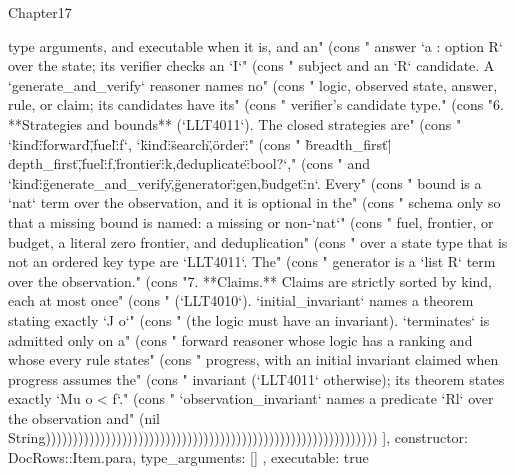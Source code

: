 \begin{lexlean}{Chapter17}
\begin{semanticmodule}
{{type arguments, and executable when it is, and an" (cons "   answer `a : option R` over the state; its verifier checks an `I`" (cons "   subject and an `R` candidate. A `generate_and_verify` reasoner names no" (cons "   logic, observed state, answer, rule, or claim; its candidates have its" (cons "   verifier's candidate type." (cons "6. **Strategies and bounds** (`LLT4011`). The closed strategies are" (cons "   `{\"kind\":\"forward\",\"fuel\":f}`, `{\"kind\":\"search\",\"order\":" (cons "   \"breadth_first\"|\"depth_first\",\"fuel\":f,\"frontier\":k,\"deduplicate\":bool?}`," (cons "   and `{\"kind\":\"generate_and_verify\",\"generator\":gen,\"budget\":n}`. Every" (cons "   bound is a `nat` term over the observation, and it is optional in the" (cons "   schema only so that a missing bound is named: a missing or non-`nat`" (cons "   fuel, frontier, or budget, a literal zero frontier, and deduplication" (cons "   over a state type that is not an ordered key type are `LLT4011`. The" (cons "   generator is a `list R` term over the observation." (cons "7. **Claims.** Claims are strictly sorted by kind, each at most once" (cons "   (`LLT4010`). `initial_invariant` names a theorem stating exactly `J o`" (cons "   (the logic must have an invariant). `terminates` is admitted only on a" (cons "   forward reasoner whose logic has a ranking and whose every rule states" (cons "   progress, with an initial invariant claimed when progress assumes the" (cons "   invariant (`LLT4011` otherwise); its theorem states exactly `Mu o < f`." (cons "   `observation_invariant` names a predicate `Rl` over the observation and" (nil String)))))))))))))))))))))))))))))))))))))))))))))))))))))))))))))
    ],
    constructor: DocRows::Item.para,
    type_arguments: []
  },
  executable: true
}


\end{semanticmodule}
\end{lexlean}
